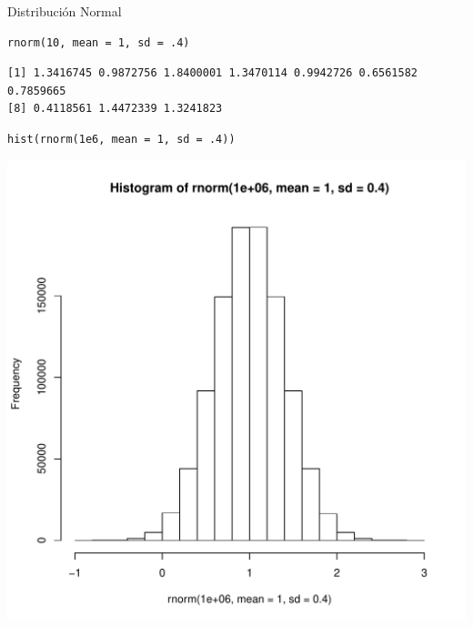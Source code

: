 \documentclass[xcolor={usenames,svgnames,dvipsnames}]{beamer}
\begin{document}
\begin{frame}[fragile,label=sec-3-3]{Distribución Normal}
 \lstset{language=R,label= ,caption= ,numbers=none}
\begin{lstlisting}
rnorm(10, mean = 1, sd = .4)
\end{lstlisting}

\begin{verbatim}
[1] 1.3416745 0.9872756 1.8400001 1.3470114 0.9942726 0.6561582 0.7859665
[8] 0.4118561 1.4472339 1.3241823
\end{verbatim}

\lstset{language=R,label= ,caption= ,numbers=none}
\begin{lstlisting}
hist(rnorm(1e6, mean = 1, sd = .4))
\end{lstlisting}

\includegraphics[height=0.6\textheight]{figs/rnorm.pdf}
\end{frame}
\end{document}
